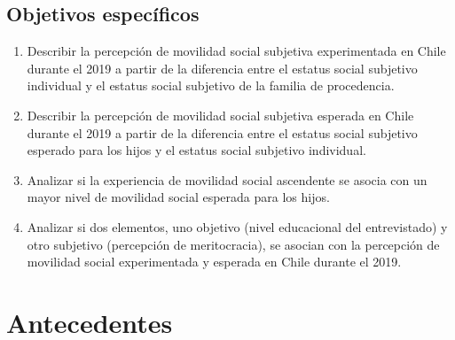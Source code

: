 \documentclass[
]{article}
\begin{document}
\hypertarget{objetivos-especuxedficos}{%
\subsection{Objetivos específicos}\label{objetivos-especuxedficos}}

\begin{enumerate}
\def\labelenumi{\arabic{enumi}.}
\item
  Describir la percepción de movilidad social subjetiva experimentada en
  Chile durante el 2019 a partir de la diferencia entre el estatus
  social subjetivo individual y el estatus social subjetivo de la
  familia de procedencia.
\item
  Describir la percepción de movilidad social subjetiva esperada en
  Chile durante el 2019 a partir de la diferencia entre el estatus
  social subjetivo esperado para los hijos y el estatus social subjetivo
  individual.
\item
  Analizar si la experiencia de movilidad social ascendente se asocia
  con un mayor nivel de movilidad social esperada para los hijos.
\item
  Analizar si dos elementos, uno objetivo (nivel educacional del
  entrevistado) y otro subjetivo (percepción de meritocracia), se
  asocian con la percepción de movilidad social experimentada y esperada
  en Chile durante el 2019.
\end{enumerate}

\hypertarget{antecedentes}{%
\section{Antecedentes}\label{antecedentes}}
\end{document}
